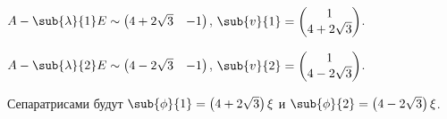 \documentclass[a5paper,10pt]{article}
\begin{document}
\begin{enumerate}
    $A - \sub{\lambda}{1} E \sim \begin{pmatrix} 4 + 2\sqrt{3} & -1 \end{pmatrix}$,
    $\sub{v}{1} = \begin{pmatrix} 1 \\ 4 + 2\sqrt{3} \end{pmatrix}$.
    
    $A - \sub{\lambda}{2} E \sim \begin{pmatrix} 4 - 2\sqrt{3} & -1 \end{pmatrix}$,
    $\sub{v}{2} = \begin{pmatrix} 1 \\ 4 - 2\sqrt{3} \end{pmatrix}$.
    
    Сепаратрисами будут $\sub{\phi}{1} = \br{4 + 2\sqrt{3}} \xi$ 
    и $\sub{\phi}{2} = \br{4 - 2\sqrt{3}} \xi$.
\end{enumerate}
\end{document}
